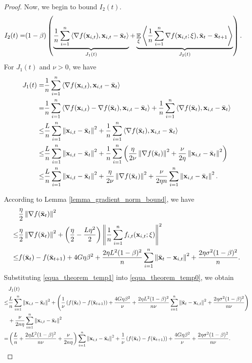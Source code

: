 \documentclass{article}
\begin{document}
\begin{proof}
Now, we begin to bound $I_2(t)$.
\begin{align}
\nonumber
I_2(t) = & (1-\beta) \left( \underbrace{ \frac{1}{n}\sum_{i=1}^n\left\langle\nabla f({\bf x}_{i,t}), {\bf x}_{i,t} - \bar{{\bf x}}_t  \right\rangle }_{J_1(t)} +  \underbrace{ \mathop{\mathbb{E}}_{\xi}\left\langle\frac{1}{n}\sum_{i=1}^n \nabla f({\bf x}_{i,t};\xi), \bar{{\bf x}}_t - \bar{{\bf x}}_{t+1}  \right\rangle}_{J_2(t)} \right).
\end{align} For $J_1(t)$ and $\nu>0$, we have
\begin{align}
\nonumber
J_1(t) = & \frac{1}{n}\sum_{i=1}^n\left\langle\nabla f({\bf x}_{i,t}), {\bf x}_{i,t} - \bar{{\bf x}}_t  \right\rangle \\ \nonumber
= & \frac{1}{n}\sum_{i=1}^n\left\langle\nabla f({\bf x}_{i,t}) - \nabla f(\bar{{\bf x}}_t), {\bf x}_{i,t} - \bar{{\bf x}}_t  \right\rangle + \frac{1}{n}\sum_{i=1}^n\left\langle\nabla f(\bar{{\bf x}}_t), {\bf x}_{i,t} - \bar{{\bf x}}_t  \right\rangle \\ \nonumber
\le & \frac{L}{n}\sum_{i=1}^n \left\lVert{\bf x}_{i,t} - \bar{{\bf x}}_t\right\rVert^2 + \frac{1}{n}\sum_{i=1}^n\left\langle\nabla f(\bar{{\bf x}}_t), {\bf x}_{i,t} - \bar{{\bf x}}_t  \right\rangle \\ \nonumber
\le & \frac{L}{n}\sum_{i=1}^n \left\lVert{\bf x}_{i,t} - \bar{{\bf x}}_t\right\rVert^2 + \frac{1}{n}\sum_{i=1}^n\left( \frac{\eta}{2\nu}\left\lVert\nabla f(\bar{{\bf x}}_t)\right\rVert^2 + \frac{\nu}{2\eta}\left\lVert{\bf x}_{i,t} - \bar{{\bf x}}_t \right\rVert^2  \right) \\ \label{equa_theorem_temp0}
\le & \frac{L}{n}\sum_{i=1}^n \left\lVert{\bf x}_{i,t} - \bar{{\bf x}}_t\right\rVert^2 + \frac{\eta}{2\nu}\left\lVert\nabla f(\bar{{\bf x}}_t)\right\rVert^2 + \frac{\nu}{2\eta n}\sum_{i=1}^n\left\lVert{\bf x}_{i,t} - \bar{{\bf x}}_t \right\rVert^2. 
\end{align}

According to Lemma \ref{lemma_gradient_norm_bound}, we have
\begin{align}
\nonumber
& \frac{\eta}{2}\left\lVert\nabla f(\bar{{\bf x}}_t)\right\rVert^2  \\ \nonumber
\le & \frac{\eta}{2}\left\lVert\nabla f(\bar{{\bf x}}_t)\right\rVert^2 + \left( \frac{\eta}{2} - \frac{L\eta^2}{2} \right)\left\lVert\frac{1}{n}\sum_{i=1}^n f_{i,t}({\bf x}_{i,t};\xi)\right\rVert^2 \\ \label{equa_theorem_temp1}
\le & f(\bar{{\bf x}}_t) - f(\bar{{\bf x}}_{t+1}) + 4G\eta\beta^2 +  \frac{2\eta L^2(1-\beta)^2}{n}\sum_{i=1}^n\left\lVert\bar{{\bf x}}_t - {\bf x}_{i,t} \right\rVert^2 + \frac{2\eta \sigma^2 (1-\beta)^2}{n}.
\end{align} Substituting \eqref{equa_theorem_temp1} into \eqref{equa_theorem_temp0}, we obtain
\begin{align}
\nonumber
& J_1(t) \\ \nonumber 
\le & \frac{L}{n}\sum_{i=1}^n \left\lVert{\bf x}_{i,t} - \bar{{\bf x}}_t\right\rVert^2 + \left(  \frac{1}{\nu}\left( f(\bar{{\bf x}}_t) - f(\bar{{\bf x}}_{t+1}) \right) + \frac{4G\eta\beta^2}{\nu} +  \frac{2\eta L^2(1-\beta)^2}{n\nu}\sum_{i=1}^n\left\lVert\bar{{\bf x}}_t - {\bf x}_{i,t} \right\rVert^2 + \frac{2\eta \sigma^2 (1-\beta)^2}{n\nu}  \right)\\ \nonumber 
& + \frac{\nu}{2n\eta}\sum_{i=1}^n\left\lVert{\bf x}_{i,t} - \bar{{\bf x}}_t \right\rVert^2  \\ \nonumber
= & \left(  \frac{L}{n} + \frac{2\eta L^2(1-\beta)^2}{n\nu} + \frac{\nu}{2n\eta}  \right)\sum_{i=1}^n\left\lVert{\bf x}_{i,t} - \bar{{\bf x}}_t \right\rVert^2 + \frac{1}{\nu}\left( f(\bar{{\bf x}}_t) - f(\bar{{\bf x}}_{t+1}) \right) + \frac{4G\eta\beta^2}{\nu} + \frac{2\eta \sigma^2 (1-\beta)^2}{n\nu}.
\end{align}


\end{proof}
\end{document}
